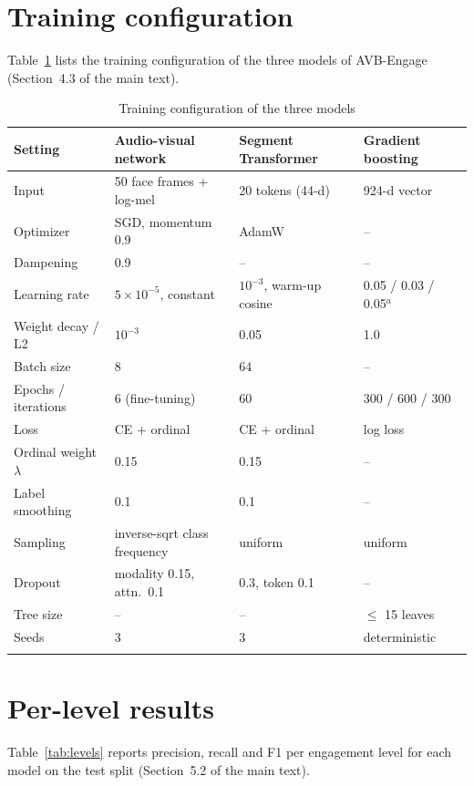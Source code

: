 \documentclass[pdflatex,sn-basic]{sn-jnl}
\newcommand{\ournet}{AVB-Engage}
\begin{document}
\section{Training configuration}\label{sec:s_config}

Table~\ref{tab:config} lists the training configuration of the three models of \ournet{} (Section~4.3 of the main text).

\begin{table}[t]
\caption{Training configuration of the three models}\label{tab:config}
\begin{tabular*}{\textwidth}{@{\extracolsep\fill}llll}
\toprule
Setting & Audio-visual network & Segment Transformer & Gradient boosting\\
\midrule
Input & 50 face frames + log-mel & 20 tokens (44-d) & 924-d vector\\
Optimizer & SGD, momentum 0.9 & AdamW & --\\
Dampening & 0.9 & -- & --\\
Learning rate & $5 \times 10^{-5}$, constant & $10^{-3}$, warm-up cosine & 0.05 / 0.03 / 0.05$^{a}$\\
Weight decay / L2 & $10^{-3}$ & 0.05 & 1.0\\
Batch size & 8 & 64 & --\\
Epochs / iterations & 6 (fine-tuning) & 60 & 300 / 600 / 300\\
Loss & CE + ordinal & CE + ordinal & log loss\\
Ordinal weight $\lambda$ & 0.15 & 0.15 & --\\
Label smoothing & 0.1 & 0.1 & --\\
Sampling & inverse-sqrt class frequency & uniform & uniform\\
Dropout & modality 0.15, attn.\ 0.1 & 0.3, token 0.1 & --\\
Tree size & -- & -- & $\le$ 15 leaves\\
Seeds & 3 & 3 & deterministic\\
\botrule
\end{tabular*}
\end{table}

\section{Per-level results}\label{sec:s_levels}

Table~\ref{tab:levels} reports precision, recall and F1 per engagement level for each model on the test split (Section~5.2 of the main text).
\end{document}
